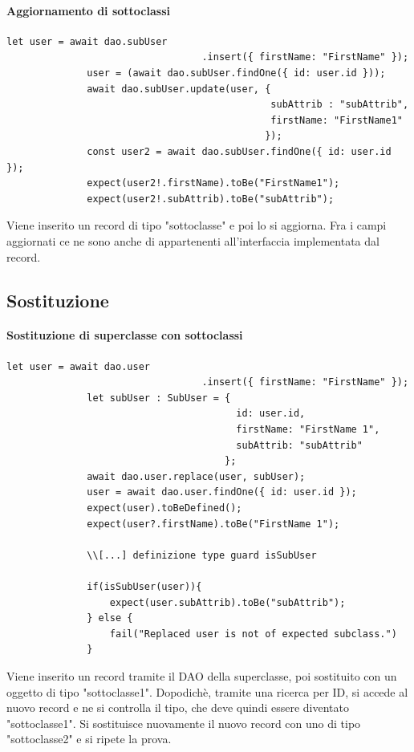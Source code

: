 \documentclass[a4paper, 12pt]{report}
\begin{document}
          \paragraph{Aggiornamento di sottoclassi}
            \begin{Verbatim}[samepage=true]
              let user = await dao.subUser
                                  .insert({ firstName: "FirstName" });
              user = (await dao.subUser.findOne({ id: user.id }));
              await dao.subUser.update(user, { 
                                              subAttrib : "subAttrib",
                                              firstName: "FirstName1"
                                             });
              const user2 = await dao.subUser.findOne({ id: user.id });
              expect(user2!.firstName).toBe("FirstName1");
              expect(user2!.subAttrib).toBe("subAttrib");
            \end{Verbatim}
            Viene inserito un record di tipo "sottoclasse" e poi lo si aggiorna.
            Fra i campi aggiornati ce ne sono anche di appartenenti all'interfaccia implementata dal record.
          \newpage
        \subsection{Sostituzione}
          \paragraph{Sostituzione di superclasse con sottoclassi}
            \begin{Verbatim}[samepage=true]
              let user = await dao.user
                                  .insert({ firstName: "FirstName" });
              let subUser : SubUser = { 
                                        id: user.id,
                                        firstName: "FirstName 1",
                                        subAttrib: "subAttrib"
                                      };
              await dao.user.replace(user, subUser);
              user = await dao.user.findOne({ id: user.id });
              expect(user).toBeDefined();
              expect(user?.firstName).toBe("FirstName 1");

              \\[...] definizione type guard isSubUser
          
              if(isSubUser(user)){
                  expect(user.subAttrib).toBe("subAttrib");
              } else {
                  fail("Replaced user is not of expected subclass.")
              }
            \end{Verbatim}
            Viene inserito un record tramite il DAO della superclasse, poi sostituito con un oggetto di tipo "sottoclasse1".
            Dopodichè, tramite una ricerca per ID, si accede al nuovo record e ne si controlla il tipo, che deve quindi essere diventato "sottoclasse1".
            Si sostituisce nuovamente il nuovo record con uno di tipo "sottoclasse2" e si ripete la prova.
        \newpage
\end{document}
